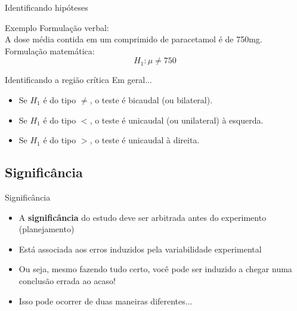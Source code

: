 \documentclass{beamer}
\begin{document}
\begin{frame}{\scriptsize Identificando hipóteses}
  \begin{exampleblock}{Exemplo}
    \footnotesize
    Formulação verbal:\\
    A dose média contida em um comprimido de paracetamol é de 750mg.\\
    \bigskip
    Formulação matemática:\\
    \begin{displaymath}
      H_1: \mu \ne 750
    \end{displaymath}
  \end{exampleblock}
  \begin{center}
  \end{center}
\end{frame}

\begin{frame}{\scriptsize Identificando a região crítica}
  Em geral...
  \begin{itemize}
  \item Se $H_1$ é do tipo $\ne$, o teste é bicaudal (ou bilateral).
  \item Se $H_1$ é do tipo $<$, o teste é unicaudal (ou unilateral) à esquerda.
  \item Se $H_1$ é do tipo $>$, o teste é unicaudal à direita.
  \end{itemize}
\end{frame}

\subsection{Significância}
\begin{frame}{\scriptsize Significância}
  \begin{itemize}
  \item A {\bf significância} do estudo deve ser arbitrada antes do experimento (planejamento)
  \item Está associada aos erros induzidos pela variabilidade experimental
  \item Ou seja, mesmo fazendo tudo certo, você pode ser induzido a chegar numa conclusão errada ao acaso!
  \item Isso pode ocorrer de duas maneiras diferentes...
  \end{itemize}
\end{frame}
\end{document}
